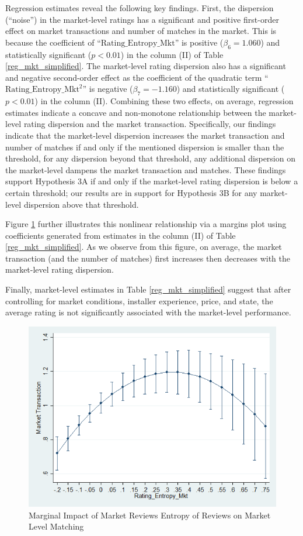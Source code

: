 \documentclass[msom,blindrev]{informs3}
\begin{document}
Regression estimates reveal the following key findings. First, the dispersion (``noise'') in the market-level ratings has a significant and positive first-order effect on market transactions and number of matches in the market. This is because the coefficient of ``$\text{Rating\_Entropy\_Mkt}$'' is positive ($\beta_{6}=1.060$) and statistically significant ($p<0.01$) in the column (II) of Table \ref{reg_mkt_simplified}. The market-level rating dispersion also has a significant and negative second-order effect as the coefficient of the quadratic term ``$\text{Rating\_Entropy\_Mkt}^2$'' is negative ($\beta_{7}=-1.160$) and statistically significant ($p<0.01$) in the column (II). Combining these two effects, on average, regression estimates indicate a concave and non-monotone relationship between the market-level rating dispersion and the market transaction.  Specifically, our findings indicate that the market-level dispersion increases the market transaction and number of matches if and only if the mentioned dispersion is smaller than the threshold, for any dispersion beyond that threshold, any additional dispersion on the market-level dampens the market transaction and matches. These findings support Hypothesis 3A if and only if the market-level rating dispersion is below a certain threshold; our results are in support for Hypothesis 3B for any market-level dispersion above that threshold.

Figure \ref{fig: marginsplot_mkt_entmkt} further illustrates this nonlinear relationship via a margins plot using coefficients generated from estimates in the column (II) of Table \ref{reg_mkt_simplified}. As we observe from this figure, on average, the market transaction (and the number of matches) first increases then decreases with the market-level rating dispersion.

Finally, market-level estimates in Table \ref{reg_mkt_simplified} suggest that after controlling for market conditions, installer experience, price, and state, the average rating is not significantly associated with the market-level performance.
\begin{figure}
	\centering
	\includegraphics[width=0.7\linewidth]{marginsplot_entmkt.png}
	\caption{Marginal Impact of Market Reviews Entropy of Reviews on Market Level Matching}
	\label{fig: marginsplot_mkt_entmkt}
\end{figure}
\end{document}
